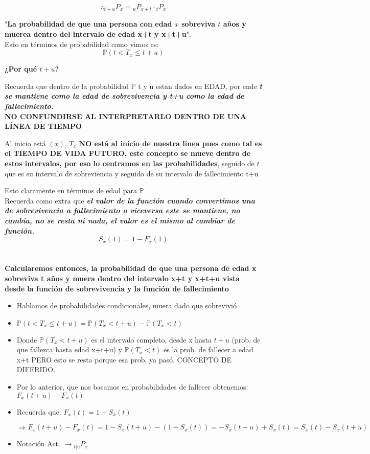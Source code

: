 \documentclass{article}
\begin{document}
\[\therefore {}_{t+u}P_x = {}_uP_{x+t}\cdot {}_tP_{x}\]

"\textbf{La probabilidad de que una persona con edad \(x\) sobreviva \(t\) años y muerea dentro del intervalo de edad x+t y x+t+u}".
\\
Esto en términos de probabilidad como vimos es:
\[\mathbb{P}(t<T_x\leq t+u)\]

\textbf{¿Por qué \(t+u\)?}

Recuerda que dentro de la probabilidad \(\mathbb{P}\) t y u estan dados en EDAD, por ende \textbf{\textit{t se mantiene como la edad de sobrevivencia y t+u como la edad de fallecimiento. }}
\\

\textbf{NO CONFUNDIRSE AL INTERPRETARLO DENTRO DE UNA LÍNEA DE TIEMPO}

Al inicio está \((x)\), \(T_x\) \textbf{NO está al inicio de nuestra linea pues como tal es el TIEMPO DE VIDA FUTURO, este concepto se mueve dentro de estos intervalos, por eso lo centramos en las probabilidades}, seguido de \(t\) que es su intervalo de sobreviencia y seguido de su intervalo de fallecimiento t+u

Esto claramente en términos de edad para \(\mathbb{P}\)
\\

Recuerda como extra que \textbf{\textit{el valor de la función cuando convertimos una de sobrevivencia a fallecimiento o viceversa este se mantiene, no cambia, no se resta ni nada, el valor es el mismo al cambiar de función.}}
\[S_x(1) = 1-F_x(1) \]
\\\\
\textbf{Calcularemos entonces, la probabilidad de que una persona de edad x sobreviva t años y muera dentro del intervalo x+t y x+t+u vista desde la función de sobrevivencia y la función de fallecimiento}

\begin{itemize}
    \item Hablamos de probabilidades condicionales, muera dado que sobrevivió
    \item \(\mathbb{P}(t<T_x\leq t+u) = \mathbb{P}(T_x < t+u) - \mathbb{P}(T_x < t)\)
        \item Donde \(\mathbb{P}(T_x < t+u)\) es el intervalo completo, desde x hasta \(t+u\) (prob. de que fallezca hasta edad x+t+u) y \(\mathbb{P}(T_x < t)\) es la prob. de fallecer a edad x+t PERO esto se resta porque esa prob. ya pasó. CONCEPTO DE DIFERIDO.
        \item Por lo anterior, que nos basamos en probabilidades de fallecer obtenemos: \(F_x(t+u) - F_x(t)\)
        \item Recuerda que: \(F_x(t) = 1- S_x(t)\)
        
        \(\Rightarrow F_x(t+u) - F_x(t) = 1-S_x(t+u) - (1-S_x(t))= -S_x(t+u)+S_x(t) = S_x(t) - S_x(t+u)\)
    \item Notación Act. \(\rightarrow {}_{t|u}P_x\)
\end{itemize}
\end{document}
